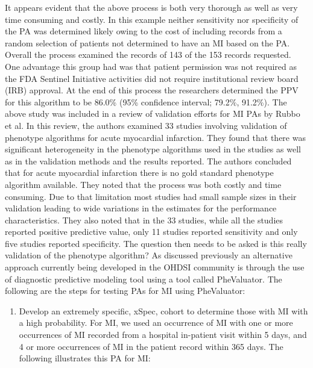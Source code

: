 \documentclass[11pt]{book}
\providecommand{\tightlist}{%
  \setlength{\itemsep}{0pt}\setlength{\parskip}{0pt}}
\theoremstyle{definition}
\theoremstyle{definition}
\theoremstyle{definition}
\theoremstyle{remark}
\begin{document}
It appears evident that the above process is both very thorough as well as very time consuming and costly. In this example neither sensitivity nor specificity of the PA was determined likely owing to the cost of including records from a random selection of patients not determined to have an MI based on the PA. Overall the process examined the records of 143 of the 153 records requested. One advantage this group had was that patient permission was not required as the FDA Sentinel Initiative activities did not require institutional review board (IRB) approval. At the end of this process the researchers determined the PPV for this algorithm to be 86.0\% (95\% confidence interval; 79.2\%, 91.2\%). 
The above study was included in a review of validation efforts for MI PAs by Rubbo et al.\citep{rubbo_use_2015} In this review, the authors examined 33 studies involving validation of phenotype algorithms for acute myocardial infarction. They found that there was significant heterogeneity in the phenotype algorithms used in the studies as well as in the validation methods and the results reported. The authors concluded that for acute myocardial infarction there is no gold standard phenotype algorithm available. They noted that the process was both costly and time consuming. Due to that limitation most studies had small sample sizes in their validation leading to wide variations in the estimates for the performance characteristics. They also noted that in the 33 studies, while all the studies reported positive predictive value, only 11 studies reported sensitivity and only five studies reported specificity. The question then needs to be asked is this really validation of the phenotype algorithm?
As discussed previously an alternative approach currently being developed in the OHDSI community is through the use of diagnostic predictive modeling tool using a tool called PheValuator. The following are the steps for testing PAs for MI using PheValuator:

\begin{enumerate}
\def\labelenumi{\arabic{enumi})}
\tightlist
\item
  Develop an extremely specific, xSpec, cohort to determine those with MI with a high probability. For MI, we used an occurrence of MI with one or more occurrences of MI recorded from a hospital in-patient visit within 5 days, and 4 or more occurrences of MI in the patient record within 365 days. The following illustrates this PA for MI:
\end{enumerate}
\end{document}
